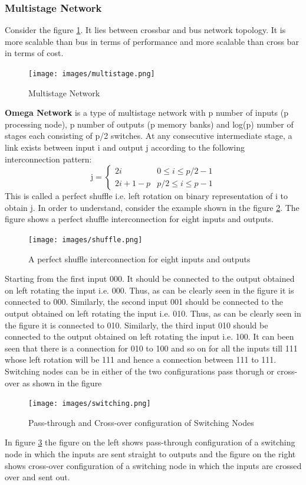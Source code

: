 \documentclass[12pt]{article}
\begin{document}
\subsubsection{Multistage Network}
Consider the figure \ref{fig:multistage}. It lies between crossbar and bus network topology.
It is more scalable than bus in terms of performance and more scalable than cross bar in terms of cost.
\begin{figure}[H]
    \centering
    \texttt{[image: images/multistage.png]}
    \caption{Multistage Network}
    \label{fig:multistage}
\end{figure}
\textbf{Omega Network} is a type of multistage network with p number of inputs (p processing node), 
p number of outputs (p memory banks) and log(p) number of stages each consisting of p/2 switches. At any consecutive intermediate stage, 
a link exists between input i and output j according to the following interconnection pattern:
\begin{equation}
    \text{j} = 
    \begin{cases}
        2i & 0\leq i\leq p/2-1 \\
        2i+1-p & p/2\leq i\leq p-1
    \end{cases}
\end{equation}
This is called a perfect shuffle i.e. left rotation on binary representation of i to obtain j.
In order to understand, consider the example shown in the figure \ref{fig:shuffle}. The figure shows a perfect shuffle interconnection for eight inputs and outputs.
\begin{figure}[H]
    \centering
    \texttt{[image: images/shuffle.png]}
    \caption{A perfect shuffle interconnection for eight inputs and outputs}
    \label{fig:shuffle}
\end{figure}
Starting from the first input 000. It should be connected to the output obtained on left rotating the input i.e. 000. 
Thus, as can be clearly seen in the figure it is connected to 000. Similarly, the second input 001 should be connected to the output obtained on left rotating the input i.e. 010.
Thus, as can be clearly seen in the figure it is connected to 010. Similarly, the third input 010 should be connected to the output obtained on left rotating the input i.e. 100. 
It can been seen that there is a connection for 010 to 100 and so on for all the inputs till 111 whose left rotation will be 111 and hence a connection between 111 to 111.
Switching nodes can be in either of the two configurations pass thorugh or cross-over as shown in the figure 
\begin{figure}[H]
    \centering
    \texttt{[image: images/switching.png]}
    \caption{Pass-through and Cross-over configuration of Switching Nodes}
    \label{fig:switching}
\end{figure}
In figure \ref{fig:switching} the figure on the left shows pass-through configuration of a switching node in which the inputs are sent straight to outputs
and the figure on the right shows cross-over configuration of a switching node in which the inputs are crossed over and sent out.
\end{document}
